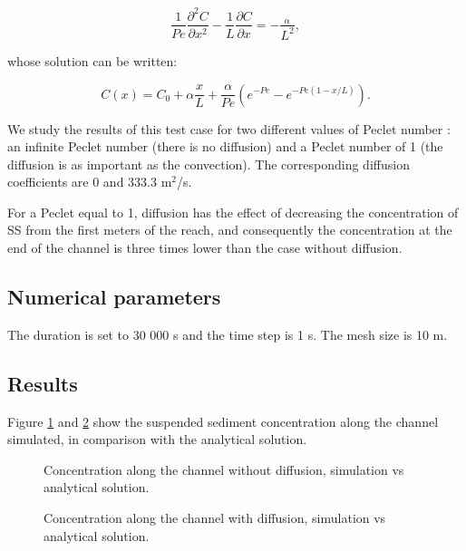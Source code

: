 \begin{equation}
\frac{1}{Pe} \frac{\partial^2 C}{\partial x^2} -
\frac{1}{L} \frac{\partial C}{\partial x} =- \frac{ _\alpha}{ L^2},
\label{eq:sol4}
\end{equation}

whose solution can be written:

\begin{equation}
C(x)=C_0+\alpha \frac{x}{L} + \frac{\alpha}{Pe}
\left( e^{-Pe}-e^{-Pe (1-x/L)} \right).
\label{eq:}
\end{equation}

We study the results of this test case for two different values of
Peclet number : an infinite Peclet number (there is no diffusion)
and a Peclet number of 1 (the diffusion is as important as the
convection). The corresponding diffusion coefficients are 0 and 333.3
m$^2$/s.

For a Peclet equal to 1, diffusion has the effect of decreasing the
concentration of SS from the first meters of the reach, and
consequently the concentration at the end of the channel is three
times lower than the case without diffusion.

\subsection{Numerical parameters}

The duration is set to 30 000 s and the time step is 1 s.
The mesh size is 10 m.

\subsection{Results}

Figure \ref{fig:gaia:erosion:nodiff} and \ref{fig:gaia:erosion:diff} show the
suspended sediment concentration along the channel simulated, in
comparison with the analytical solution.

\begin{figure}[h]
 \centering
 \caption{Concentration along the channel without diffusion,
  simulation vs analytical solution.}
 \label{fig:gaia:erosion:nodiff}
\end{figure}

\begin{figure}[h]
 \centering
 \caption{Concentration along the channel with diffusion,
  simulation vs analytical solution.}
 \label{fig:gaia:erosion:diff}
\end{figure}

